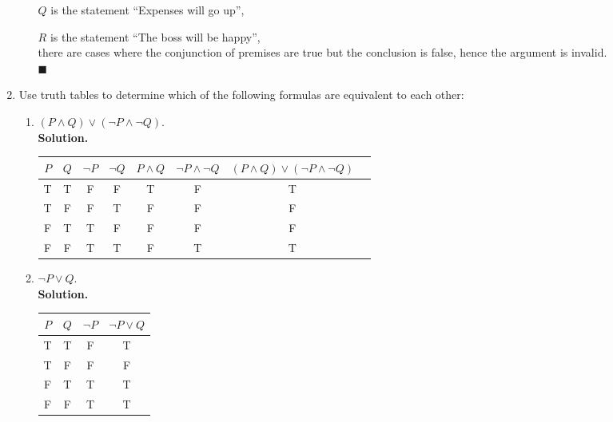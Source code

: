 \documentclass{report}
\newcommand{\sol}{\vspace{1em}\\\textbf{Solution.}\vspace{0.5em}}
\newcommand{\qed}{‎\\‎\hfill$\blacksquare$\vspace{1em}}
\begin{document}
\begin{enumerate}[leftmargin=*]
\begin{enumerate}
                    $Q$ is the statement ``Expenses will go up'',

                    $R$ is the statement ``The boss will be happy'',\\

                    there are cases where the conjunction of premises are true but the conclusion
                    is false, hence the argument is invalid.\qed
          \end{enumerate}

    \item Use truth tables to determine which of the following formulas are equivalent to
          each other:
          \begin{enumerate}
              \item $(P \wedge Q) \vee(\neg P \wedge \neg Q)$.
                    \sol{}
                    \begin{center}
                        \begin{tabular}{cccccccc}
                            $P$ & $Q$ & $\neg P$ & $\neg Q$ & $P \wedge Q$ & $\neg P \wedge \neg Q$ & $(P \wedge Q) \vee(\neg P \wedge \neg Q)$ \\
                            \hline
                            T   & T   & F        & F        & T            & F                      & T                                         \\
                            T   & F   & F        & T        & F            & F                      & F                                         \\
                            F   & T   & T        & F        & F            & F                      & F                                         \\
                            F   & F   & T        & T        & F            & T                      & T
                        \end{tabular}
                    \end{center}

              \item $\neg P \vee Q$.
                    \sol{}
                    \begin{center}
                        \begin{tabular}{cccc}
                            $P$ & $Q$ & $\neg P$ & $\neg P \vee Q$ \\
                            \hline
                            T   & T   & F        & T               \\
                            T   & F   & F        & F               \\
                            F   & T   & T        & T               \\
                            F   & F   & T        & T
                        \end{tabular}
                    \end{center}


\end{enumerate}
\end{enumerate}
\end{document}
